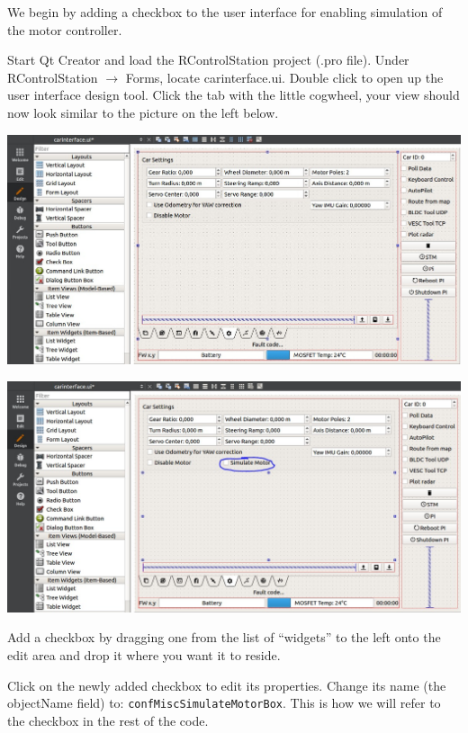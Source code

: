 \documentclass[12pt]{article} %
\begin{document}
We begin by adding a checkbox to the user interface for enabling simulation
of the motor controller. 

Start Qt Creator and load the RControlStation project (.pro
file). Under RControlStation $\rightarrow$ Forms, locate
carinterface.ui. Double click to open up the user interface design
tool. Click the tab with the little cogwheel, your view should now
look similar to the picture on the left below.

\begin{minipage}[b]{0.45\textwidth}
  \includegraphics[width=\textwidth]{pictures/GUI_before.jpg}
\end{minipage}
\hfill
\begin{minipage}[b]{0.45\textwidth}
  \includegraphics[width=\textwidth]{pictures/GUI_after.jpg}
\end{minipage}

Add a checkbox by dragging one from the list of ``widgets'' to the
left onto the edit area and drop it where you want it to reside.

Click on the newly added checkbox to edit its properties. Change its
name (the objectName field) to:
{\verb!confMiscSimulateMotorBox!}. This is how we will refer to the
checkbox in the rest of the code.
\end{document}
